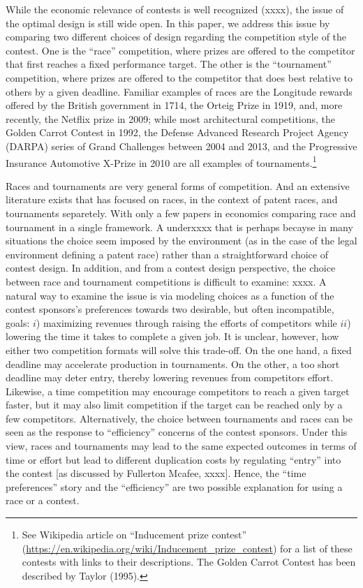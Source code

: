 \documentclass[11pt, titlepage]{article}
\begin{document}
While the economic relevance of contests is well recognized (xxxx), the
issue of the optimal design is still wide open. In this paper, we
address this issue by comparing two different choices of design
regarding the competition style of the contest. One is the ``race''
competition, where prizes are offered to the competitor that first
reaches a fixed performance target. The other is the ``tournament''
competition, where prizes are offered to the competitor that does best
relative to others by a given deadline. Familiar examples of races are
the Longitude rewards offered by the British government in 1714, the
Orteig Prize in 1919, and, more recently, the Netflix prize in 2009;
while most architectural competitions, the Golden Carrot Contest in
1992, the Defense Advanced Research Project Agency (DARPA) series of
Grand Challenges between 2004 and 2013, and the Progressive Insurance
Automotive X-Prize in 2010 are all examples of tournaments.\footnote{See
  Wikipedia article on ``Inducement prize contest''
  (\url{https://en.wikipedia.org/wiki/Inducement_prize_contest}) for a
  list of these contests with links to their descriptions. The Golden
  Carrot Contest has been described by Taylor (1995).}

Races and tournaments are very general forms of competition. And an
extensive literature exists that has focused on races, in the context of
patent races, and tournaments separetely. With only a few papers in
economics comparing race and tournament in a single framework. A
underxxxx that is perhaps becayse in many situations the choice seem
imposed by the environment (as in the case of the legal environment
defining a patent race) rather than a straightforward choice of contest
design. In addition, and from a contest design perspective, the choice
between race and tournament competitions is difficult to examine: xxxx.
A natural way to examine the issue is via modeling choices as a function
of the contest sponsors's preferences towards two desirable, but often
incompatible, goals: \(i\)) maximizing revenues through raising the
efforts of competitors while \(ii\)) lowering the time it takes to
complete a given job. It is unclear, however, how either two competition
formats will solve this trade-off. On the one hand, a fixed deadline may
accelerate production in tournaments. On the other, a too short deadline
may deter entry, thereby lowering revenues from competitors effort.
Likewise, a time competition may encourage competitors to reach a given
target faster, but it may also limit competition if the target can be
reached only by a few competitors. Alternatively, the choice between
tournaments and races can be seen as the response to ``efficiency''
concerns of the contest sponsors. Under this view, races and tournaments
may lead to the same expected outcomes in terms of time or effort but
lead to different duplication costs by regulating ``entry'' into the
contest {[}as discussed by Fullerton Mcafee, xxxx{]}. Hence, the ``time
preferences'' story and the ``efficiency'' are two possible explanation
for using a race or a contest.
\end{document}
